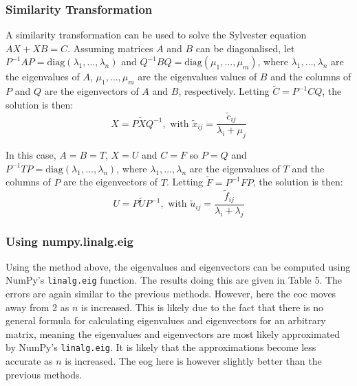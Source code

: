 \documentclass{article}
\numberwithin{equation}{section}
\begin{document}
\subsubsection{Similarity Transformation}
A similarity transformation \cite{Simoncini} can be used to solve the Sylvester equation $AX + XB = C$. Assuming matrices $A$ and $B$ can be diagonalised, let $P^{-1}AP = \text{diag}(\lambda_1, \dots, \lambda_n)$ and $Q^{-1}BQ = \text{diag}(\mu_1, \dots, \mu_m)$, where $\lambda_1, \dots, \lambda_n$ are the eigenvalues of $A$, $\mu_1, \dots, \mu_m$ are the eigenvalues values of $B$ and the columns of $P$ and $Q$ are the eigenvectors of $A$ and $B$, respectively. Letting $\tilde{C} = P^{-1}CQ$, the solution is then:
\[ X = P \tilde{X} Q^{-1}, \text{ with } \tilde{x}_{ij} = \frac{\tilde{c}_{ij}}{\lambda_i + \mu_j} \]

In this case, $A=B=T$, $X=U$ and $C=F$ so $P=Q$ and $P^{-1}TP = \text{diag}(\lambda_1, \dots, \lambda_n)$, where $\lambda_1, \dots, \lambda_n$ are the eigenvalues of $T$ and the columns of $P$ are the eigenvectors of $T$. Letting $\tilde{F}=P^{-1}FP$, the solution is then:
\[ U = P \tilde{U} P^{-1}, \text{ with } \tilde{u}_{ij} = \frac{\tilde{f}_{ij}}{\lambda_i + \lambda_j} \]

\subsubsection*{Using numpy.linalg.eig}
Using the method above, the eigenvalues and eigenvectors can be computed using NumPy's \texttt{linalg.eig} function. The results doing this are given in Table 5. The errors are again similar to the previous methods. However, here the eoc moves away from 2 as $n$ is increased. This is likely due to the fact that there is no general formula for calculating eigenvalues and eigenvectors for an arbitrary matrix, meaning the eigenvalues and eigenvectors are most likely approximated by NumPy's \texttt{linalg.eig}. It is likely that the approximations become less accurate as $n$ is increased. The eog here is however slightly better than the previous methods. 
\end{document}
